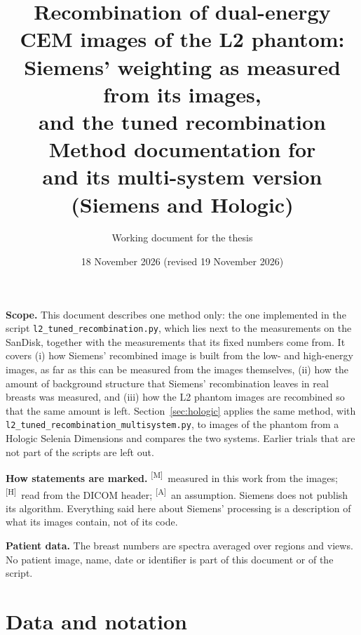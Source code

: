 \documentclass[11pt,a4paper]{article}
\title{Recombination of dual-energy CEM images of the L2 phantom:\\ Siemens' weighting as measured from its images,\\ and the tuned recombination\\[4pt]
\large Method documentation for \code{l2\_tuned\_recombination.py}\\ and its multi-system version (Siemens and Hologic)}
\author{Working document for the thesis}
\date{18 November 2026 (revised 19 November 2026)}
\newcommand{\M}{\textsuperscript{[M]}}
\newcommand{\Hd}{\textsuperscript{[H]}}
\newcommand{\As}{\textsuperscript{[A]}}
\newcommand{\code}[1]{\texttt{#1}}
\begin{document}
\maketitle

{\sloppy \noindent\textbf{Scope.} This document describes one method only: the one implemented in the script
\code{l2\_tuned\_recombination.py}, which lies next to the measurements on the SanDisk, together with the
measurements that its fixed numbers come from. It covers (i) how Siemens' recombined image is built from the low- and high-energy images, as far as this can
be measured from the images themselves, (ii) how the amount of background structure that Siemens' recombination
leaves in real breasts was measured, and (iii) how the L2 phantom images are recombined so that the same amount is
left. Section~\ref{sec:hologic} applies the same method, with \code{l2\_tuned\_recombination\_multisystem.py}, to
images of the phantom from a Hologic Selenia Dimensions and compares the two systems. Earlier trials that are not
part of the scripts are left out.\par}

\medskip
\noindent\textbf{How statements are marked.}
\M\ measured in this work from the images; \Hd\ read from the DICOM header; \As\ an assumption.
Siemens does not publish its algorithm. Everything said here about Siemens' processing is a description of what its
images contain, not of its code.

\medskip
\noindent\textbf{Patient data.} The breast numbers are spectra averaged over regions and views. No patient image, name,
date or identifier is part of this document or of the script.

\tableofcontents
\newpage

\section{Data and notation}
\end{document}
